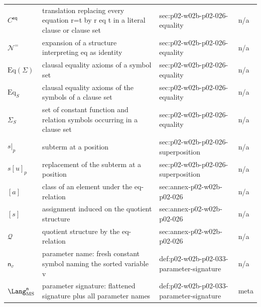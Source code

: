 \begin{longtable}{@{}p{}p{}p{}p{}@{}}
\(C^{\mathsf{eq}}\) & translation replacing every equation r=t by r eq t in a literal clause or clause set & sec:\allowbreak{}p02-\allowbreak{}w02b-\allowbreak{}p02-\allowbreak{}026-\allowbreak{}equality & n/a \\
\(\mathcal N^{=}\) & expansion of a structure interpreting eq as identity & sec:\allowbreak{}p02-\allowbreak{}w02b-\allowbreak{}p02-\allowbreak{}026-\allowbreak{}equality & n/a \\
\(\mathrm{Eq}(\Sigma)\) & clausal equality axioms of a symbol set & sec:\allowbreak{}p02-\allowbreak{}w02b-\allowbreak{}p02-\allowbreak{}026-\allowbreak{}equality & n/a \\
\(\mathrm{Eq}_S\) & clausal equality axioms of the symbols of a clause set & sec:\allowbreak{}p02-\allowbreak{}w02b-\allowbreak{}p02-\allowbreak{}026-\allowbreak{}equality & n/a \\
\(\Sigma_S\) & set of constant function and relation symbols occurring in a clause set & sec:\allowbreak{}p02-\allowbreak{}w02b-\allowbreak{}p02-\allowbreak{}026-\allowbreak{}equality & n/a \\
\(s|_p\) & subterm at a position & sec:\allowbreak{}p02-\allowbreak{}w02b-\allowbreak{}p02-\allowbreak{}026-\allowbreak{}superposition & n/a \\
\(s[u]_p\) & replacement of the subterm at a position & sec:\allowbreak{}p02-\allowbreak{}w02b-\allowbreak{}p02-\allowbreak{}026-\allowbreak{}superposition & n/a \\
\([a]\) & class of an element under the eq-relation & sec:\allowbreak{}annex-\allowbreak{}p02-\allowbreak{}w02b-\allowbreak{}p02-\allowbreak{}026 & n/a \\
\([s]\) & assignment induced on the quotient structure & sec:\allowbreak{}annex-\allowbreak{}p02-\allowbreak{}w02b-\allowbreak{}p02-\allowbreak{}026 & n/a \\
\(\mathcal Q\) & quotient structure by the eq-relation & sec:\allowbreak{}annex-\allowbreak{}p02-\allowbreak{}w02b-\allowbreak{}p02-\allowbreak{}026 & n/a \\
\(\mathsf n_v\) & parameter name: fresh constant symbol naming the sorted variable v & def:\allowbreak{}p02-\allowbreak{}w02b-\allowbreak{}p02-\allowbreak{}033-\allowbreak{}parameter-\allowbreak{}signature & n/a \\
\(\Lang_{\mathrm{MS}}^{\mathsf n}\) & parameter signature: flattened signature plus all parameter names & def:\allowbreak{}p02-\allowbreak{}w02b-\allowbreak{}p02-\allowbreak{}033-\allowbreak{}parameter-\allowbreak{}signature & meta \\

\end{longtable}

